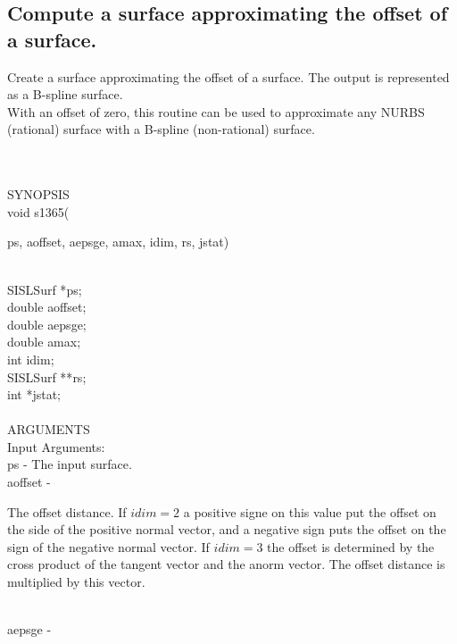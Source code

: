 \subsection{Compute a surface approximating the offset of a surface.}
\begin{minipg1}
  Create a surface approximating the offset of a surface.
  The output is represented as a B-spline surface.\\
  With an offset of zero, this routine can be used to approximate any
  NURBS (rational) surface with a B-spline (non-rational) surface.
\end{minipg1} \\ \\
SYNOPSIS\\
        \>void s1365(\begin{minipg3}
          {\fov ps}, {\fov aoffset}, {\fov aepsge}, {\fov amax}, {\fov idim}, {\fov rs}, {\fov jstat})
        \end{minipg3}\\[0.3ex]
        \>\>    SISLSurf \> *{\fov ps};\\
        \>\>    double   \> {\fov aoffset};\\
        \>\>    double   \> {\fov aepsge};\\
        \>\>    double   \> {\fov amax};\\
        \>\>    int      \> {\fov idim};\\
        \>\>    SISLSurf \> **{\fov rs};\\
        \>\>    int      \> *{\fov jstat};\\
\\
ARGUMENTS\\
        \>Input Arguments:\\
        \>\>    {\fov ps} \> - \> The input surface.\\
        \>\>    {\fov aoffset} \> - \>
        \begin{minipg2}
          The offset distance.
          If $idim=2$ a positive signe on this value put the
          offset on the side of the positive normal vector,
          and a negative sign puts the offset on the sign
          of the negative normal vector.
          If $idim=3$ the offset is determined by the cross
          product of the tangent vector and the anorm vector.
          The offset distance is multiplied by this vector.
        \end{minipg2}\\[0.8ex]
        \>\>    {\fov aepsge} \> - \>
